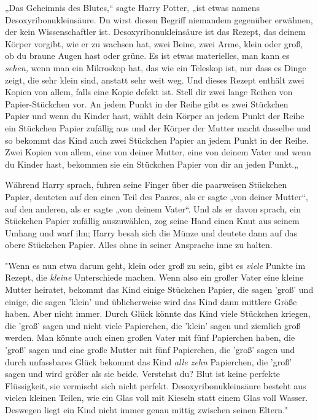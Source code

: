 {„Das Geheimnis des Blutes,“ sagte Harry Potter, „ist etwas namens Desoxyribonukleinsäure. Du wirst diesen Begriff niemandem gegenüber erwähnen, der kein Wissenschaftler ist. Desoxyribonukleinsäure ist das Rezept, das deinem Körper vorgibt, wie er zu wachsen hat, zwei Beine, zwei Arme, klein oder groß, ob du braune Augen hast oder grüne. Es ist etwas materielles, man kann es \emph{sehen,} wenn man ein Mikroskop hat, das wie ein Teleskop ist, nur dass es Dinge zeigt, die sehr klein sind, anstatt sehr weit weg. Und dieses Rezept enthält zwei Kopien von allem, falls eine Kopie defekt ist. Stell dir zwei lange Reihen von Papier-Stückchen vor. An jedem Punkt in der Reihe gibt es zwei Stückchen Papier und wenn du Kinder hast, wählt dein Körper an jedem Punkt der Reihe ein Stückchen Papier zufällig aus und der Körper der Mutter macht dasselbe und so bekommt das Kind auch zwei Stückchen Papier an jedem Punkt in der Reihe. Zwei Kopien von allem, eine von deiner Mutter, eine von deinem Vater und wenn du Kinder hast, bekommen sie ein Stückchen Papier von dir an jeden Punkt.„

Während Harry sprach, fuhren seine Finger über die paarweisen Stückchen Papier, deuteten auf den einen Teil des Paares, als er sagte „von deiner Mutter“, auf den anderen, als er sagte „von deinem Vater“. Und als er davon sprach, ein Stückchen Papier zufällig auszuwählen, zog seine Hand einen Knut aus seinem Umhang und warf ihn; Harry besah sich die Münze und deutete dann auf das obere Stückchen Papier. Alles ohne in seiner Ansprache inne zu halten.

"Wenn es nun etwa darum geht, klein oder groß zu sein, gibt es \emph{viele} Punkte im Rezept, die \emph{kleine} Unterschiede machen. Wenn also ein großer Vater eine kleine Mutter heiratet, bekommt das Kind einige Stückchen Papier, die sagen 'groß' und einige, die sagen 'klein' und üblicherweise wird das Kind dann mittlere Größe haben. Aber nicht immer. Durch Glück könnte das Kind viele Stückchen kriegen, die 'groß' sagen und nicht viele Papierchen, die 'klein' sagen und ziemlich groß werden. Man könnte auch einen großen Vater mit fünf Papierchen haben, die 'groß' sagen und eine große Mutter mit fünf Papierchen, die 'groß' sagen und durch unfassbares Glück bekommt das Kind \emph{alle zehn} Papierchen, die 'groß' sagen und wird größer als sie beide. Verstehst du? Blut ist keine perfekte Flüssigkeit, sie vermischt sich nicht perfekt. Desoxyribonukleinsäure besteht aus vielen kleinen Teilen, wie ein Glas voll mit Kieseln statt einem Glas voll Wasser. Deswegen liegt ein Kind nicht immer genau mittig zwischen seinen Eltern."

}
